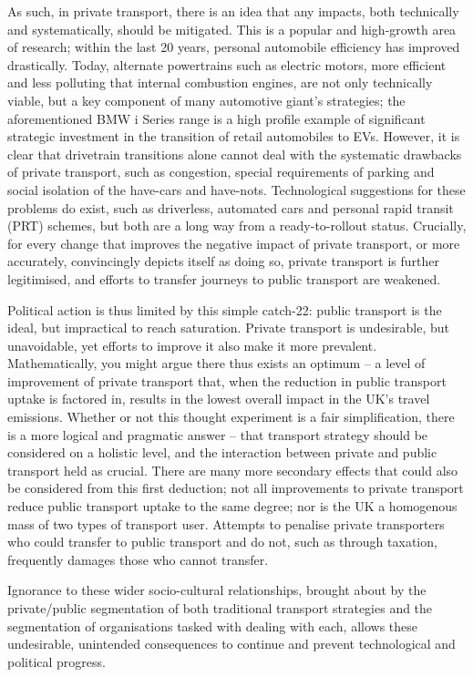 \documentclass[journal]{IEEEtran}
\begin{document}
As such, in private transport, there is an idea that any impacts, both
technically and systematically, should be mitigated. This is a popular
and high-growth area of research; within the last 20 years, personal
automobile efficiency has improved drastically. Today, alternate
powertrains such as electric motors, more efficient and less polluting
that internal combustion engines, are not only technically viable, but
a key component of many automotive giant’s strategies; the
aforementioned BMW i Series range is a high profile example of
significant strategic investment in the transition of retail
automobiles to EVs. However, it is clear that drivetrain transitions
alone cannot deal with the systematic drawbacks of private transport,
such as congestion, special requirements of parking and social
isolation of the have-cars and have-nots. Technological suggestions
for these problems do exist, such as driverless, automated cars and
personal rapid transit (PRT) schemes, but both are a long way from a
ready-to-rollout status. Crucially, for every change that improves the
negative impact of private transport, or more accurately, convincingly
depicts itself as doing so, private transport is further legitimised,
and efforts to transfer journeys to public transport are weakened.

Political action is thus limited by this simple catch-22: public
transport is the ideal, but impractical to reach saturation. Private
transport is undesirable, but unavoidable, yet efforts to improve it
also make it more prevalent. Mathematically, you might argue there
thus exists an optimum -- a level of improvement of private transport
that, when the reduction in public transport uptake is factored in,
results in the lowest overall impact in the UK's travel
emissions. Whether or not this thought experiment is a fair
simplification, there is a more logical and pragmatic answer -- that
transport strategy should be considered on a holistic level, and the
interaction between private and public transport held as
crucial. There are many more secondary effects that could also be
considered from this first deduction; not all improvements to private
transport reduce public transport uptake to the same degree; nor is
the UK a homogenous mass of two types of transport user. Attempts to
penalise private transporters who could transfer to public transport
and do not, such as through taxation, frequently damages those who
cannot transfer.

Ignorance to these wider socio-cultural relationships, brought about
by the private/public segmentation of both traditional transport
strategies and the segmentation of organisations tasked with dealing
with each, allows these undesirable, unintended consequences to
continue and prevent technological and political progress.
\end{document}
